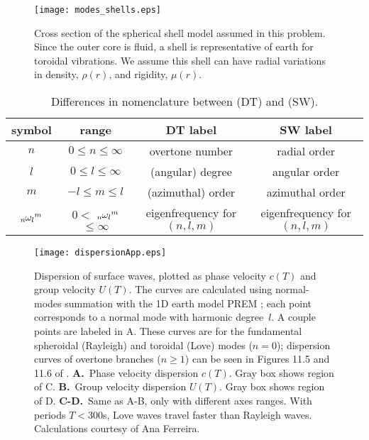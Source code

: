 \documentclass[11pt,titlepage,fleqn]{article}
\newcommand{\omnl}{\mbox{${}_{n\hspace{-0.2 mm}}\omega_l$}}  %
\begin{document}

\begin{figure}[h]
\begin{center}
\texttt{[image: modes\_shells.eps]}
\caption[]
{{
Cross section of the spherical shell model assumed in this problem. Since the outer core is fluid, a shell is representative of earth for toroidal vibrations. We assume this shell can have radial variations in density, $\rho(r)$, and rigidity, $\mu(r)$.
\label{fig:shells}
}}
\end{center}
\end{figure}



\begin{table}[h]
\centering
\caption[]
{{
Differences in nomenclature between \citet{DT} (DT) and \citet{SteinWysession} (SW).
\label{tab:names}
}}
\tgap
\begin{tabular}{||c|c|c|c||}
\hline
symbol & range & DT label & SW label \\ \hline\hline
$n$ & $0 \le n \le \infty$ & overtone number & radial order \\ \hline
$l$ & $0 \le l \le \infty$ & (angular) degree & angular order \\ \hline
$m$ & $-l \le m \le l$ & (azimuthal) order & azimuthal order \\ \hline
$\omnl^m$ & $0 < $ $\omnl^m$ $ \le \infty$ & eigenfrequency for $(n,l,m)$ & eigenfrequency for $(n,l,m)$ \\ \hline
\end{tabular}
\end{table}



\clearpage\pagebreak
\begin{figure}
\centering
\texttt{[image: dispersionApp.eps]}
\caption[Dispersion of surface waves]
{{
Dispersion of surface waves, plotted as phase velocity $c(T)$ and group velocity $U(T)$. The curves are calculated using normal-modes summation with the 1D earth model PREM \citep{PREM}; each point corresponds to a normal mode with harmonic degree~$l$. A couple points are labeled in A. These curves are for the fundamental spheroidal (Rayleigh) and toroidal (Love) modes ($n = 0$); dispersion curves of overtone branches ($n \ge 1$)  can be seen in Figures 11.5 and 11.6 of \citet{DT}.
{\bf A.}~Phase velocity dispersion $c(T)$. Gray box shows region of C.
{\bf B.}~Group velocity dispersion $U(T)$. Gray box shows region of D.
{\bf C-D.}~Same as A-B, only with different axes ranges. With periods $T<300$s, Love waves travel faster than Rayleigh waves. Calculations courtesy of Ana Ferreira.
}}
\label{fig:dispersionApp}
\end{figure}
\end{document}
